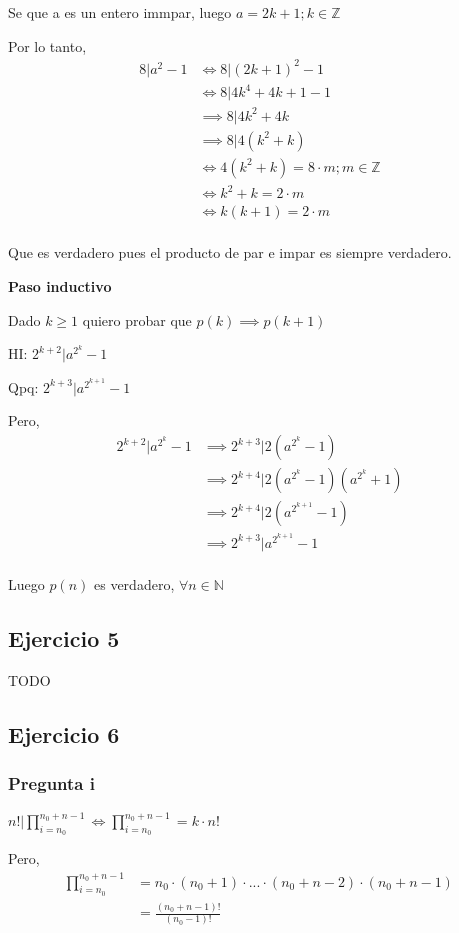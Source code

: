 Se que a es un entero immpar, luego $ a = 2k + 1; k \in \mathbb{Z} $

Por lo tanto,
\begin{align*}
    8 | a^{2}-1 &\iff 8 | (2k + 1)^{2}-1 \\
    &\iff 8 | 4k^4 + 4k + 1 - 1 \\
    &\implies 8 | 4k^2 + 4k \\
    &\implies 8 | 4(k^2 + k) \\
    &\iff 4(k^2 + k) = 8\cdot m; m \in \mathbb{Z} \\
    &\iff k^2 + k = 2\cdot m \\
    &\iff k(k+1) = 2\cdot m \\
\end{align*}

Que es verdadero pues el producto de par e impar es siempre verdadero.

\textbf{Paso inductivo}

Dado $ k \geq 1 $ quiero probar que $ p(k) \implies p(k+1) $

HI: $ 2^{k+2}|a^{2^k}-1 $

Qpq: $ 2^{k+3}|a^{2^{k+1}}-1 $

Pero,
\begin{align*}
    2^{k+2} | a^{2^k}-1 &\implies 2^{k+3} | 2(a^{2^k}-1) \\
    &\implies 2^{k+4} | 2(a^{2^k}-1)(a^{2^k}+1) \\
    &\implies 2^{k+4} | 2(a^{2^{k+1}}-1) \\
    &\implies 2^{k+3} | a^{2^{k+1}}-1 \\
\end{align*}

Luego $p(n)$ es verdadero, $ \forall n \in \mathbb{N} $

\subsection{Ejercicio 5}
TODO

\subsection{Ejercicio 6}
\subsubsection{Pregunta i}
$ n! | \prod_{i = n_0}^{n_0 + n - 1} \iff \prod_{i = n_0}^{n_0 + n - 1} = k\cdot n!$

Pero,
\begin{align*}
    \prod_{i = n_0}^{n_0 + n - 1} &= n_0 \cdot (n_0 +1) \cdot ... \cdot (n_0 + n - 2) \cdot (n_0 + n -1) \\
    &= \frac{(n_0+n-1)!}{(n_0-1)!}
\end{align*}

